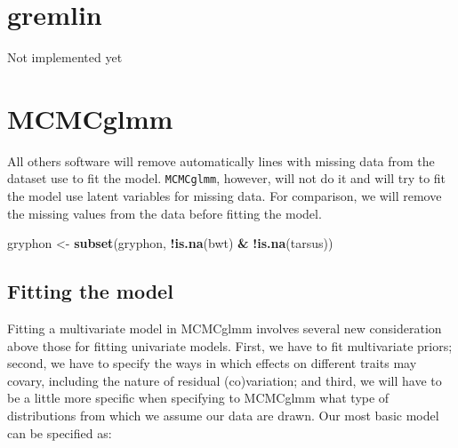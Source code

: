 \documentclass[12pt,]{book}
\newenvironment{Shaded}{\begin{snugshade}}{\end{snugshade}}
\newcommand{\KeywordTok}[1]{\textcolor[rgb]{0.13,0.29,0.53}{\textbf{#1}}}
\newcommand{\NormalTok}[1]{#1}
\newcommand{\OperatorTok}[1]{\textcolor[rgb]{0.81,0.36,0.00}{\textbf{#1}}}
\newcommand{\StringTok}[1]{\textcolor[rgb]{0.31,0.60,0.02}{#1}}
\begin{document}
\hypertarget{gremlin-2}{%
\section{gremlin}\label{gremlin-2}}

Not implemented yet

\hypertarget{mcmcglmm-2}{%
\section{MCMCglmm}\label{mcmcglmm-2}}

All others software will remove automatically lines with missing data from the dataset use to fit the model.
\texttt{MCMCglmm}, however, will not do it and will try to fit the model use latent variables for missing data.
For comparison, we will remove the missing values from the data before fitting the model.

\begin{Shaded}
\begin{Highlighting}[]
\NormalTok{gryphon <-}\StringTok{ }\KeywordTok{subset}\NormalTok{(gryphon, }\OperatorTok{!}\KeywordTok{is.na}\NormalTok{(bwt) }\OperatorTok{&}\StringTok{ }\OperatorTok{!}\KeywordTok{is.na}\NormalTok{(tarsus))}
\end{Highlighting}
\end{Shaded}

\hypertarget{fitting-the-model}{%
\subsection{Fitting the model}\label{fitting-the-model}}

Fitting a multivariate model in MCMCglmm involves several new consideration above those for fitting univariate models. First, we have to fit multivariate priors; second, we have to specify the ways in which effects on different traits may covary, including the nature of residual (co)variation; and third, we will have to be a little more specific when specifying to MCMCglmm what type of distributions from which we assume our data are drawn. Our most basic model can be specified as:
\end{document}
